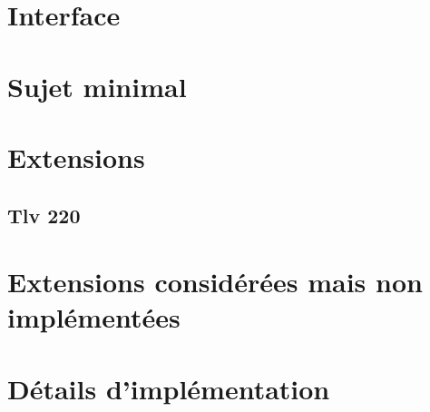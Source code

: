 \documentclass[a4paper,10pt]{article} %
\begin{document}
\section{Interface}
\section{Sujet minimal}
\section{Extensions}
\subsection{Tlv 220}
\section{Extensions considérées mais non implémentées}
\section{Détails d'implémentation}
\end{document}
